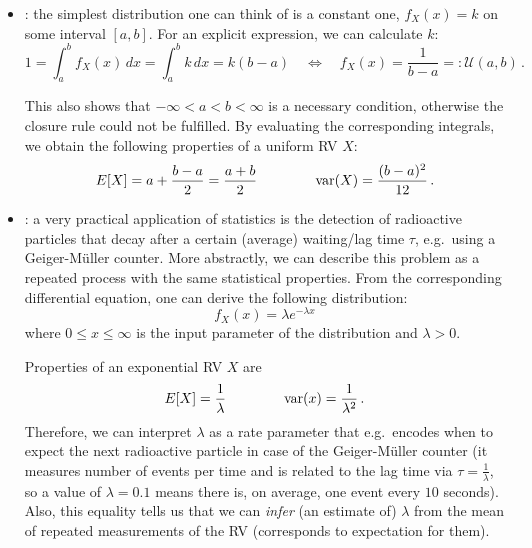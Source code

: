 \begin{ex}
\begin{itemize}
\item {}: the simplest distribution one can think of is a constant one, $f_X(x) = k$ on some interval $[a, b]$. For an explicit expression, we can calculate $k$:
\begin{equation}
1 = \int_a^b f_X(x) \, dx = \int_a^b k \, dx = k (b - a) \quad \Leftrightarrow \quad f_X(x) = \frac{1}{b - a} =: \mathcal{U}(a, b) \, .
\end{equation}

This also shows that $- \infty < a < b < \infty$ is a necessary condition, otherwise the closure rule could not be fulfilled. By evaluating the corresponding integrals, we obtain the following properties of a uniform RV $X$:
\begin{equation}
E[X] = a + \frac{b - a}{2} = \frac{a + b}{2} \qquad \qquad \operatorname{var}(X) = \frac{(b - a)^2}{12} \, .
\end{equation}


\item {}: a very practical application of statistics is the detection of radioactive particles that decay after a certain (average) waiting/lag time $\tau$, e.g.~using a Geiger-Müller counter. More abstractly, we can describe this problem as a repeated process with the same statistical properties. From the corresponding differential equation, one can derive the following distribution:
\begin{equation}\label{eq:exp_distr}
f_X(x) = \lambda e^{- \lambda x}
\end{equation}
where $0 \leq x \leq \infty$ is the input parameter of the distribution and $\lambda > 0$.%

Properties of an exponential RV $X$ are
\begin{equation}
E[X] = \frac{1}{\lambda} \qquad \qquad \operatorname{var}(x) = \frac{1}{\lambda^2} \, .
\end{equation}
Therefore, we can interpret $\lambda$ as a rate parameter that e.g.~encodes when to expect the next radioactive particle in case of the Geiger-Müller counter (it measures number of events per time and is related to the lag time via $\tau = \frac{1}{\lambda}$, so a value of $\lambda = 0.1$ means there is, on average, one event every $10$ seconds). Also, this equality tells us that we can \emph{infer} (an estimate of) $\lambda$ from the mean of repeated measurements of the RV (corresponds to expectation for them).



\end{itemize}
\end{ex}
